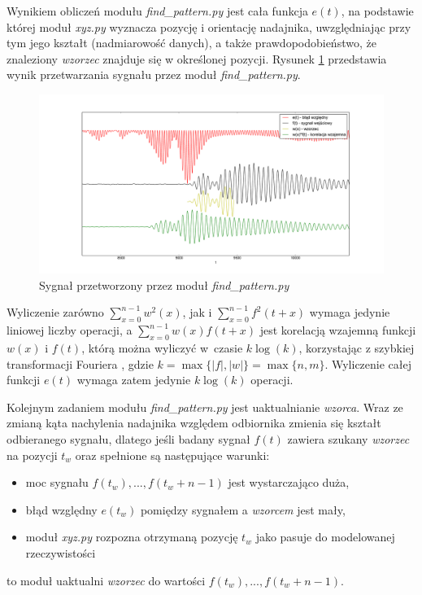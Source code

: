  Wynikiem obliczeń modułu \textit{find\_pattern.py} jest cała funkcja $e(t)$, na podstawie której moduł \textit{xyz.py}
 wyznacza pozycję i orientację nadajnika, uwzględniając przy tym 
 jego kształt (nadmiarowość danych), a także prawdopodobieństwo, że znaleziony \textit{wzorzec} znajduje się w określonej pozycji.
 Rysunek \ref{fig:blad_korel} przedstawia wynik przetwarzania sygnału przez moduł \textit{find\_pattern.py}.

\begin{figure}[h]
    \centering
    \includegraphics[width=1.0\textwidth, trim= 50mm 0mm 40mm 0mm,clip]{blad_korel}
    \caption{Sygnał przetworzony przez moduł \textit{find\_pattern.py}}
    \label{fig:blad_korel}
\end{figure}
 
 
 Wyliczenie zarówno $ \sum\limits_{x=0}^{n-1}  w^2(x) $,
jak i $\sum\limits_{x=0}^{n-1} f^2(t+x)$ wymaga jedynie liniowej liczby operacji, a 
 $\sum\limits_{x=0}^{n-1}  w(x) f(t+x) $ jest korelacją wzajemną funkcji $w(x)$ i $f(t)$, którą
 można wyliczyć w~czasie $k \log(k)$, korzystając z szybkiej transformacji Fouriera \cite{bib:FFT_correlation},
 gdzie $k = \max \{|f|, |w| \} = \max \{n,m\}$. Wyliczenie całej funkcji $e(t)$ wymaga zatem jedynie $k \log(k)$ operacji.

 
 Kolejnym zadaniem modułu \textit{find\_pattern.py} jest uaktualnianie \textit{wzorca}.
 Wraz ze zmianą kąta nachylenia nadajnika względem odbiornika zmienia się kształt odbieranego sygnału,
 dlatego jeśli badany sygnał $f(t)$ zawiera szukany \textit{wzorzec} na pozycji $t_w$ 
 oraz spełnione są następujące warunki:
 \begin{itemize}
  \item moc sygnału $f(t_w), ..., f(t_w+n-1)$ jest wystarczająco duża,
  \item błąd względny $e(t_w)$ pomiędzy sygnałem a \textit{wzorcem} jest mały,
  \item moduł \textit{xyz.py} rozpozna otrzymaną pozycję $t_w$ jako pasuje do modelowanej rzeczywistości
 \end{itemize}
to moduł uaktualni \textit{wzorzec} do wartości $f(t_w), ..., f(t_w+n-1)$.
 
